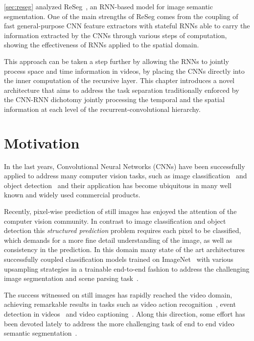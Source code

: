 \autoref{sec:reseg} analyzed ReSeg~\citep{Visin_2016_CVPR_Workshops}, an
RNN-based model for image semantic segmentation. One of the main strengths of
ReSeg comes from the coupling of fast general-purpose CNN feature extractors
with stateful RNNs able to carry the information extracted by the CNNs through
various steps of computation, showing the effectiveness of RNNs applied to the
spatial domain.

This approach can be taken a step further by allowing the RNNs to jointly
process space and time information in videos, by placing the CNNs directly into
the inner computation of the recursive layer. This chapter introduces a novel
architecture that aims to address the task separation traditionally enforced by
the CNN-RNN dichotomy jointly processing the temporal and the spatial
information at each level of the recurrent-convolutional hierarchy.


\section{Motivation}

In the last years, Convolutional Neural Networks (CNNs) have been successfully
applied to address many computer vision tasks, such as image
classification~\citep{Krizhevsky2012-alexnet,Simonyan2015,
Szegedy-et-al-arxiv2014} and object detection~\citep{Girshick-et-al-arxiv2013,
Sermanet13overfeat} and their application has become ubiquitous in many well
known and widely used commercial products.

Recently, pixel-wise prediction of still images has enjoyed the attention
of the computer vision community. In contrast to image classification and
object detection this \emph{structured prediction} problem requires each
pixel to be classified, which demands for a more fine detail understanding of
the image, as well as consistency in the prediction. In this domain many
state of the art architectures successfully coupled classification models
trained on ImageNet~\citep{Simonyan14vgg,Szegedy15googlelenet} with various
upsampling strategies in a trainable end-to-end fashion to address the
challenging image segmentation and scene parsing task~\citep[see e.g.,~][]{
long2014fully,noh2015learning}.

The success witnessed on still images has rapidly reached the video domain,
achieving remarkable results in tasks such as video action recognition~\citep{
simonyan2014two,karpathy2014large}, event detection in videos~\citep{
yeung2015end} and video captioning~\citep{yao2015describing}. Along this
direction, some effort has been devoted lately to address the more
challenging task of end to end video semantic segmentation~\citep{Tran16v2v}.

